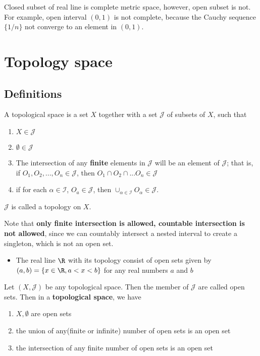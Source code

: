 \begin{refsection}
\begin{remark}
	Closed subset of real line is complete metric space, however, open subset is not. For example, open interval $(0,1)$ is not complete, because the Cauchy sequence $\{1/n\}$ not converge to an element in $(0,1)$.
\end{remark}


\section{Topology space}
\subsection{Definitions}
\begin{definition}\cite[136]{johnsonbaugh2010foundations}
A topological space is a set $X$ together with a set $\mathcal{J}$ of subsets of $X$, such that
\begin{enumerate}
\item $X \in \mathcal{J}$
\item $\emptyset \in \mathcal{J}$
\item The intersection of any \textbf{finite} elements in $\mathcal{J}$ will be an element of $\mathcal{J}$; that is, if $O_1,O_2,...,O_n \in \mathcal{J}$, then $O_1\cap O_2 \cap ...O_n \in \mathcal{J}$
\item if for each $\alpha \in \mathcal{I}$, $O_a \in \mathcal{J}$, then $\cup_{\alpha \in \mathcal{I}} O_{\alpha} \in \mathcal{J}$.
\end{enumerate}
$\mathcal{J}$ is called a topology on $X$.
\end{definition}

\begin{remark}
Note that \textbf{only finite intersection is allowed, countable intersection is not allowed}, since we can countably intersect a nested interval to create a singleton, which is not an open set.
\end{remark}


\begin{example}\hfill
\begin{itemize}
    \item The real line $\R$ with its topology consist of open sets given by $(a,b)=\{x\in \R,a<x<b\}$ for any real numbers $a$ and $b$
\end{itemize}
\end{example}


\begin{definition}
Let $(X,\mathcal{J})$ be any topological space. Then the member of $\mathcal{J}$ are called open sets. Then in a \textbf{topological space}, we have 
\begin{enumerate}
\item $X,\emptyset$ are open sets
\item the union of any(finite or infinite) number of open sets is an open set
\item the intersection of any finite number of open sets is an open set
\end{enumerate}
\end{definition}


\end{refsection}
